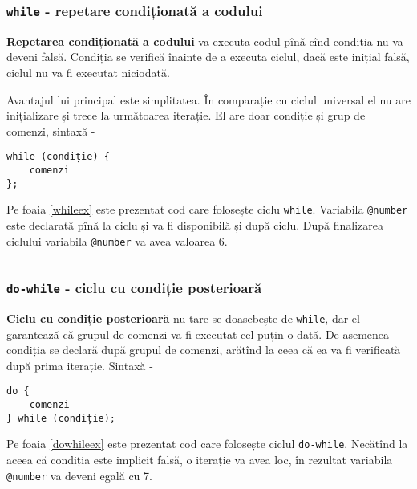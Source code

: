 \begin{sourcecode}
    \label{uniloopex}
    \inputminted[linenos]{icl}{../sources/uniloopex.icL}
\end{sourcecode}

\subsubsection{\texttt{while} - repetare condiționată a codului}

{\bf Repetarea condiționată a codului} va executa codul pînă cînd condiția nu va deveni falsă. Condiția se verifică înainte de a executa ciclul, dacă este inițial falsă, ciclul nu va fi executat niciodată.

Avantajul lui principal este simplitatea. În comparație cu ciclul universal el nu are inițializare și trece la următoarea iterație. El are doar condiție și grup de comenzi, sintaxă -
\begin{verbatim}
while (condiție) {
	comenzi
};
\end{verbatim}

Pe foaia \ref{whileex} este prezentat cod care folosește ciclu \texttt{while}. Variabila \texttt{@number} este declarată pînă la ciclu și va fi disponibilă și după ciclu. După finalizarea ciclului variabila \texttt{@number} va avea valoarea 6.

\begin{sourcecode}
    \label{whileex}
    \inputminted[linenos]{icl}{../sources/whileex.icL}
\end{sourcecode}

\subsubsection{\texttt{do-while} - ciclu cu condiție posterioară}

{\bf Ciclu cu condiție posterioară} nu tare se doasebește de \texttt{while}, dar el garantează că grupul de comenzi va fi executat cel puțin o dată. De asemenea condiția se declară după grupul de comenzi, arătînd la ceea că ea va fi verificată după prima iterație. Sintaxă -
\begin{verbatim}
do {
	comenzi
} while (condiție);
\end{verbatim}

Pe foaia \ref{dowhileex} este prezentat cod care folosește ciclul \texttt{do-while}. Necătînd la aceea că condiția este implicit falsă, o iterație va avea loc, în rezultat variabila \texttt{@number} va deveni egală cu 7.


